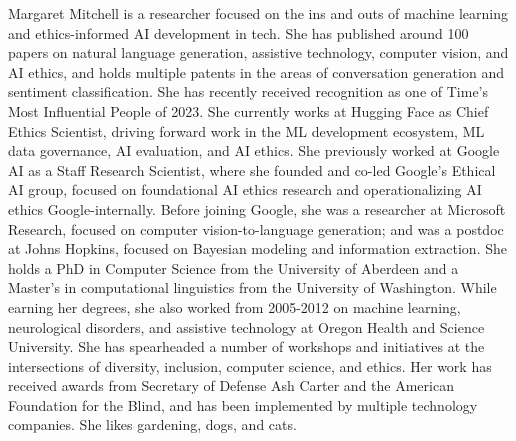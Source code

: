 Margaret Mitchell is a researcher focused on the ins and outs of machine learning and ethics-informed AI development in tech. She has published around 100 papers on natural language generation, assistive technology, computer vision, and AI ethics, and holds multiple patents in the areas of conversation generation and sentiment classification. She has recently received recognition as one of Time's Most Influential People of 2023. She currently works at Hugging Face as Chief Ethics Scientist, driving forward work in the ML development ecosystem, ML data governance, AI evaluation, and AI ethics. She previously worked at Google AI as a Staff Research Scientist, where she founded and co-led Google's Ethical AI group, focused on foundational AI ethics research and operationalizing AI ethics Google-internally. Before joining Google, she was a researcher at Microsoft Research, focused on computer vision-to-language generation; and was a postdoc at Johns Hopkins, focused on Bayesian modeling and information extraction. She holds a PhD in Computer Science from the University of Aberdeen and a Master's in computational linguistics from the University of Washington. While earning her degrees, she also worked from 2005-2012 on machine learning, neurological disorders, and assistive technology at Oregon Health and Science University. She has spearheaded a number of workshops and initiatives at the intersections of diversity, inclusion, computer science, and ethics. Her work has received awards from Secretary of Defense Ash Carter and the American Foundation for the Blind, and has been implemented by multiple technology companies. She likes gardening, dogs, and cats.